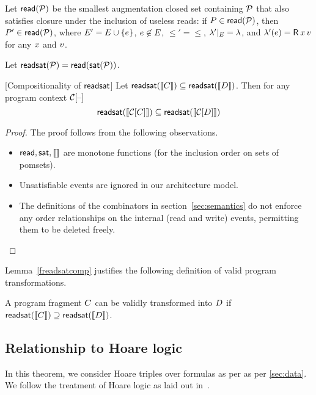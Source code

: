 Let ${\mathsf{read}}(\mathcal{P})$ be the smallest augmentation
closed set containing $\mathcal{P}$ that also satisfies closure under the inclusion
of useless reads: if $P \in {\mathsf{read}}(\mathcal{P})$, then
$P' \in {\mathsf{read}}(\mathcal{P})$, where $E'= E\cup\{e\}$,
$e \not \in E$, ${\le'} ={\le}$,
${\lambda'} \mathbin{|}_{E} = {\lambda}$, and
$\labeling'(\aEv) = \DR{\aLoc}{\aVal}$ for any $x$ and $v$.

Let $\mathsf{readsat}(\mathcal{P})= {\mathsf{read}}(\mathsf{sat}(\mathcal{P}))$.

\begin{lemma}\label{freadssatcomp}[Compositionality of $\mathsf{readsat}$]
Let $\mathsf{readsat}(\llbracket C\rrbracket) \subseteq \mathsf{readsat}(\llbracket D\rrbracket)$.  Then for any program context $\aCtxt\hole{}$
\[ \freadsat(\sem{\aCtxt\hole{\aCmd}}) \subseteq \freadsat(\sem{\aCtxt\hole{\bCmd}}) \]
\begin{proof}
The proof follows from the following observations.
\begin{itemize}
\item ${\mathsf{read}}, \mathsf{sat}, \llbracket\rrbracket$ are monotone functions (for the inclusion order on sets of pomsets). 
\item Unsatisfiable events are ignored in our architecture model.  
\item The definitions of the combinators in section~\ref{sec:semantics} do not enforce any order relationships on the internal (read and write) events, permitting them to be deleted freely.
\end{itemize}
\end{proof}
\end{lemma}
Lemma~\ref{freadsatcomp} justifies the following definition of valid program transformations. 
\begin{definition}
A program fragment $C$ can be validly transformed into $D$ if  $\mathsf{readsat}(\llbracket C\rrbracket) \supseteq  \mathsf{readsat}(\llbracket D\rrbracket)$.
\end{definition}


\subsection{Relationship to Hoare logic}
In this theorem, we consider Hoare triples over formulas as per as per \textsection\ref{sec:data}.  We follow the treatment of Hoare logic as laid out in~\citet{gordonHoare}.  

